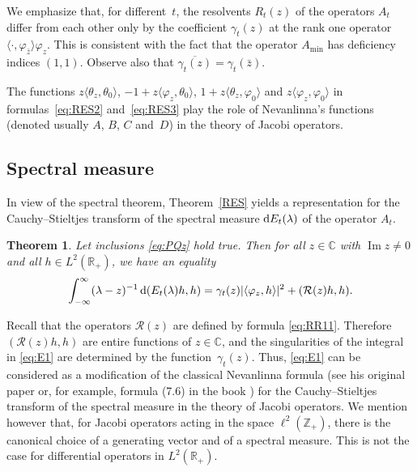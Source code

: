 \documentclass[10pt,a4paper]{amsart}
\numberwithin{equation}{section}
\newtheorem{Theorem}{Theorem}[section]
\begin{document}
We emphasize that, for different~$t$, the resolvents $R_{t}(z)$ of the operators $A_{t}$ differ from each other only by the coefficient $\gamma_{t}(z)$ at the rank one operator $\langle\cdot, \varphi_{\bar{z}}\rangle \varphi_{z}$.
 This is consistent with the fact that the operator $A_{\min}$ has deficiency indices $(1,1)$.
 Observe also that
 $ \overline{\gamma_{t}(z)}= \gamma_t (\bar{z})$.

 The functions $z \langle \theta_{z}, \theta_{0}\rangle$, $-1 +z \langle \varphi_{z}, \theta_{0}\rangle$, $ 1+ z \langle \theta_{z}, \varphi_{0}\rangle$ and $z \langle \varphi_{z}, \varphi_{0}\rangle$ in formulas~\eqref{eq:RES2} and~\eqref{eq:RES3} play the role of Nevanlinna's functions (denoted usually $A$, $B$, $C$ and~$D$) in the theory of Jacobi operators.

\subsection{Spectral measure}\label{section3.3}

In view of the spectral theorem, Theorem~\ref{RES} yields a representation for the Cauchy--Stieltjes transform of the spectral measure ${\rm d}E_{t} (\lambda)$ of the operator $A_{t}$.

 \begin{Theorem}\label{RESc}
 Let inclusions \eqref{eq:PQz} hold true.
 Then for all $z\in {\mathbb C}$ with $\operatorname{Im} z\neq 0$ and all $h\in L^2 ({\mathbb R}_{+})$, we have an equality
 \begin{equation}
 \int_{-\infty}^\infty
 (\lambda-z)^{-1} \,{\rm d} (E_{t}(\lambda)h,h)= \gamma_{t} (z)|\langle \varphi_{z},h\rangle |^2 + ({\mathcal R}(z) h,h).
 \label{eq:E1}\end{equation}
 \end{Theorem}

 Recall that the operators ${\mathcal R}(z)$ are defined by formula \eqref{eq:RR11}. Therefore $({\mathcal R}(z) h,h)$ are entire functions of $z\in{\mathbb C}$, and the singularities of the integral in \eqref{eq:E1} are determined by the function~$\gamma_{t} (z)$. Thus, \eqref{eq:E1} can be considered as a modification of the classical Nevanlinna formula (see his original paper \cite{Nevan} or, for example, formula (7.6) in the book \cite{Schm}) for the Cauchy--Stieltjes transform of the spectral measure in the theory of Jacobi operators. We mention however that, for Jacobi operators acting in the space $\ell^2 ({\mathbb Z}_{+})$, there is the canonical choice of a generating vector and of a spectral measure. This is not the case for differential operators in $L^2 ({\mathbb R}_{+})$.
\end{document}
